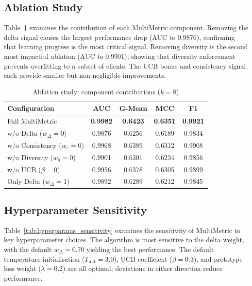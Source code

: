 \subsection{Ablation Study}

Table~\ref{tab:ablation} examines the contribution of each MultiMetric component. Removing the delta signal causes the largest performance drop (AUC to 0.9876), confirming that learning progress is the most critical signal. Removing diversity is the second most impactful ablation (AUC to 0.9901), showing that diversity enforcement prevents overfitting to a subset of clients. The UCB bonus and consistency signal each provide smaller but non-negligible improvements.

\begin{table}[htbp]
\centering
\caption{Ablation study: component contributions ($k=8$)}
\label{tab:ablation}
\begin{tabular}{|l|c|c|c|c|}
\hline
\textbf{Configuration} & \textbf{AUC} & \textbf{G-Mean} & \textbf{MCC} & \textbf{F1} \\
\hline
Full MultiMetric               & \textbf{0.9982} & \textbf{0.6423} & \textbf{0.6351} & \textbf{0.9921} \\
w/o Delta ($w_\Delta=0$)       & 0.9876 & 0.6256 & 0.6189 & 0.9834 \\
w/o Consistency ($w_c=0$)      & 0.9968 & 0.6389 & 0.6312 & 0.9908 \\
w/o Diversity ($w_d=0$)        & 0.9901 & 0.6301 & 0.6234 & 0.9856 \\
w/o UCB ($\beta=0$)            & 0.9956 & 0.6378 & 0.6305 & 0.9899 \\
Only Delta ($w_\Delta=1$)      & 0.9892 & 0.6289 & 0.6212 & 0.9845 \\
\hline
\end{tabular}
\end{table}

\subsection{Hyperparameter Sensitivity}

Table~\ref{tab:hyperparams_sensitivity} examines the sensitivity of MultiMetric to key hyperparameter choices. The algorithm is most sensitive to the delta weight, with the default $w_\Delta=0.70$ yielding the best performance. The default temperature initialisation ($T_{\text{init}}=3.0$), UCB coefficient ($\beta=0.3$), and prototype loss weight ($\lambda=0.2$) are all optimal; deviations in either direction reduce performance.


